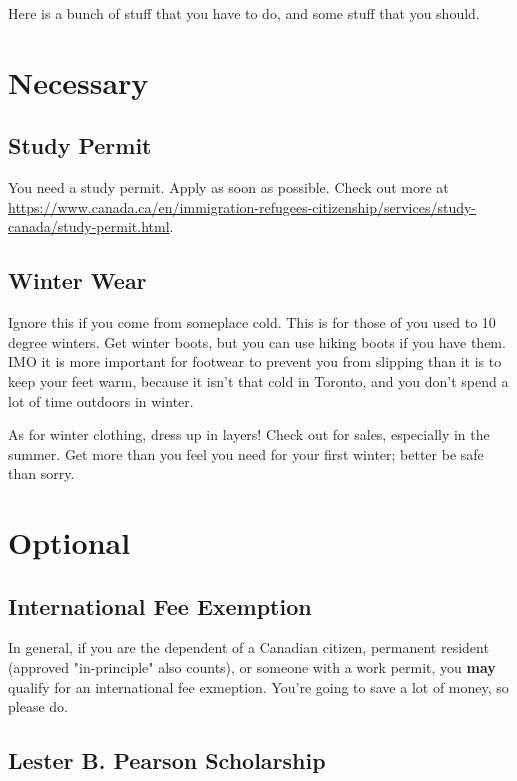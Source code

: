 Here is a bunch of stuff that you have to do, and some stuff that you should.

\section{Necessary}

\subsection{Study Permit}

You need a study permit. Apply as soon as possible. Check out more at \url{https://www.canada.ca/en/immigration-refugees-citizenship/services/study-canada/study-permit.html}.

\subsection{Winter Wear}

Ignore this if you come from someplace cold. This is for those of you used to 10 degree winters. Get winter boots, but you can use hiking boots if you have them. IMO it is more important for footwear to prevent you from slipping than it is to keep your feet warm, because it isn't that cold in Toronto, and you don't spend a lot of time outdoors in winter.

As for winter clothing, dress up in layers! Check out for sales, especially in the summer. Get more than you feel you need for your first winter; better be safe than sorry.

\section{Optional}

\subsection{International Fee Exemption}

In general, if you are the dependent of a Canadian citizen, permanent resident (approved "in-principle" also counts), or someone with a work permit, you \textbf{may} qualify for an international fee exmeption. You're going to save a lot of money, so please do.

\subsection{Lester B. Pearson Scholarship}

